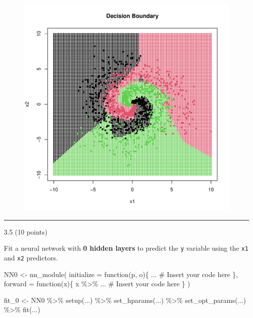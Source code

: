 \documentclass[
  letterpaper,
  DIV=11,
  numbers=noendperiod]{scrartcl}
\newenvironment{Shaded}{\begin{snugshade}}{\end{snugshade}}
\newcommand{\AttributeTok}[1]{\textcolor[rgb]{0.40,0.45,0.13}{#1}}
\newcommand{\CommentTok}[1]{\textcolor[rgb]{0.37,0.37,0.37}{#1}}
\newcommand{\ControlFlowTok}[1]{\textcolor[rgb]{0.00,0.23,0.31}{#1}}
\newcommand{\FunctionTok}[1]{\textcolor[rgb]{0.28,0.35,0.67}{#1}}
\newcommand{\NormalTok}[1]{\textcolor[rgb]{0.00,0.23,0.31}{#1}}
\newcommand{\OtherTok}[1]{\textcolor[rgb]{0.00,0.23,0.31}{#1}}
\newcommand{\SpecialCharTok}[1]{\textcolor[rgb]{0.37,0.37,0.37}{#1}}
\begin{document}
\begin{figure}[H]

{\centering \includegraphics{hw5_files/figure-pdf/unnamed-chunk-32-2.pdf}

}

\end{figure}

\begin{center}\rule{0.5\linewidth}{0.5pt}\end{center}

3.5 (10 points)

Fit a neural network with \textbf{0 hidden layers} to predict the
\texttt{y} variable using the \texttt{x1} and \texttt{x2} predictors.

\begin{Shaded}
\begin{Highlighting}[]
\NormalTok{NN0 }\OtherTok{\textless{}{-}} \FunctionTok{nn\_module}\NormalTok{(}
  \AttributeTok{initialize =} \ControlFlowTok{function}\NormalTok{(p, o)\{}
\NormalTok{    ... }\CommentTok{\# Insert your code here}
\NormalTok{  \},}
  \AttributeTok{forward =} \ControlFlowTok{function}\NormalTok{(x)\{}
\NormalTok{    x }\SpecialCharTok{\%\textgreater{}\%} 
\NormalTok{    ... }\CommentTok{\# Insert your code here}
\NormalTok{  \}}
\NormalTok{)}

\NormalTok{fit\_0 }\OtherTok{\textless{}{-}}\NormalTok{ NN0 }\SpecialCharTok{\%\textgreater{}\%} 
  \FunctionTok{setup}\NormalTok{(...) }\SpecialCharTok{\%\textgreater{}\%}
  \FunctionTok{set\_hparams}\NormalTok{(...) }\SpecialCharTok{\%\textgreater{}\%}
  \FunctionTok{set\_opt\_params}\NormalTok{(...) }\SpecialCharTok{\%\textgreater{}\%}
  \FunctionTok{fit}\NormalTok{(...)}
\end{Highlighting}
\end{Shaded}
\end{document}
